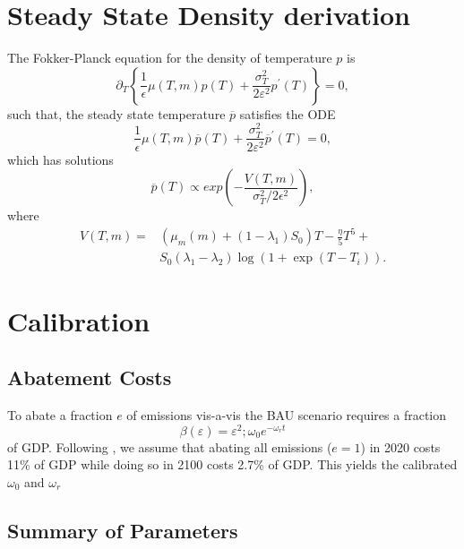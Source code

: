 \documentclass[../../main.tex]{subfiles}
\begin{document}
\section{Steady State Density derivation} \label{appendix:density}

The Fokker-Planck equation for the density of temperature $p$ is \begin{equation}
    \partial_T \left\{ \frac{1}{\epsilon} \mu(T, m) p(T) + \frac{\sigma^2_T}{2\varepsilon^2} p^\prime(T) \right\} = 0,
\end{equation} such that, the steady state temperature $\overline{p}$ satisfies the ODE \begin{equation}
    \frac{1}{\epsilon} \mu(T, m) \overline{p}(T) + \frac{\sigma^2_T}{2\varepsilon^2} \overline{p}^\prime(T) = 0,
\end{equation} which has solutions \begin{equation}
    \overline{p}(T) \propto exp\left( -\frac{V(T, m)}{\sigma^2_T / 2\epsilon^2} \right), 
\end{equation} where \begin{equation}
    \begin{split}
        V(T, m) = &(\mu_m(m) + (1 - \lambda_1)S_0) T - \frac{\eta}{5} T^5 + \\
        &S_0 (\lambda_1 - \lambda_2) \log(1 + \exp(T - T_i)).
    \end{split}
\end{equation}

\section{Calibration} \label{appendix:calibration}

\subsection{Abatement Costs}

To abate a fraction $e$ of emissions vis-a-vis the BAU scenario requires a fraction \begin{equation}
    \beta(\varepsilon) = \varepsilon^2 
    ; \omega_0 e^{-\omega_r t}
\end{equation} of GDP. Following \citep{nordhaus_revisiting_2017}, we assume that abating all emissions ($e = 1$) in 2020 costs 11\% of GDP while doing so in 2100 costs 2.7\% of GDP. This yields the calibrated $\omega_0$ and $\omega_r$

\subsection{Summary of Parameters}
\end{document}
